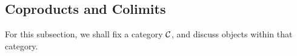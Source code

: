 
\subsection*{Coproducts and Colimits}

\begin{remark}
    For this subsection, we shall fix a category \(\mathcal{C}\),
    and discuss objects within that category.
\end{remark}

